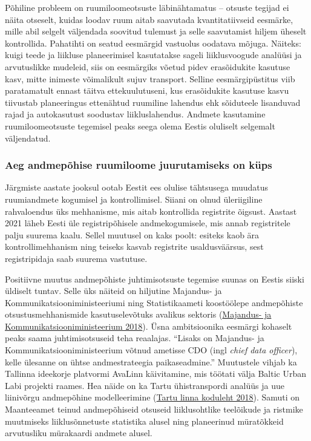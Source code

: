 \documentclass[estonian,]{article}
\begin{document}
Põhiline probleem on ruumiloomeotsuste läbinähtamatus -- otsuste tegijad ei näita otseselt, kuidas loodav ruum aitab saavutada kvantitatiivseid eesmärke, mille abil selgelt väljendada soovitud tulemust ja selle saavutamist hiljem üheselt kontrollida. Pahatihti on seatud eesmärgid vastuolus oodatava mõjuga. Näiteks: kuigi teede ja liikluse planeerimisel kasutatakse sageli liiklusvoogude analüüsi ja arvutuslikke mudeleid, siis on eesmärgiks võetud pidev erasõidukite kasutuse kasv, mitte inimeste võimalikult sujuv transport. Selline eesmärgipüstitus viib paratamatult ennast täitva ettekuulutuseni, kus erasõidukite kasutuse kasvu tiivustab planeeringus ettenähtud ruumiline lahendus ehk sõiduteele lisanduvad rajad ja autokasutust soodustav liikluslahendus. Andmete kasutamine ruumiloomeotsuste tegemisel peaks seega olema Eestis oluliselt selgemalt väljendatud.

\hypertarget{aeg-andmepuxf5hise-ruumiloome-juurutamiseks-on-kuxfcps}{%
\subsubsection*{Aeg andmepõhise ruumiloome juurutamiseks on küps}\label{aeg-andmepuxf5hise-ruumiloome-juurutamiseks-on-kuxfcps}}

Järgmiste aastate jooksul ootab Eestit ees olulise tähtsusega muudatus ruumiandmete kogumisel ja kontrollimisel. Siiani on olnud üleriigiline rahvaloendus üks mehhanisme, mis aitab kontrollida registrite õigsust. Aastast 2021 läheb Eesti üle registripõhisele andmekogumisele, mis annab registritele palju suurema kaalu. Sellel muutusel on kaks poolt: esiteks kaob ära kontrollimehhanism ning teiseks kasvab registrite usaldusväärsus, sest registripidaja saab suurema vastutuse.

Positiivne muutus andmepõhiste juhtimisotsuste tegemise suunas on Eestis siiski üldiselt tuntav. Selle üks näiteid on hiljutine Majandus- ja Kommunikatsiooniministeeriumi ning Statistikaameti koostöölepe andmepõhiste otsustusmehhanismide kasutuselevõtuks avalikus sektoris (\protect\hyperlink{Majandus2018}{Majandus- ja Kommunikatsiooniministeerium 2018}). Üsna ambitsioonika eesmärgi kohaselt peaks saama juhtimisotsuseid teha reaalajas. ``Lisaks on Majandus- ja Kommunikatsiooniministeerium võtnud ametisse CDO (ingl \emph{chief data officer}), kelle ülesanne on ühtse andmestrateegia paikaseadmine.'' Muutustele vihjab ka Tallinna ideekorje platvormi AvaLinn käivitamine, mis töötati välja Baltic Urban Labi projekti raames. Hea näide on ka Tartu ühistranspordi analüüs ja uue liinivõrgu andmepõhine modelleerimine (\protect\hyperlink{Tartu2018}{Tartu linna koduleht 2018}). Samuti on Maanteeamet teinud andmepõhiseid otsuseid liiklusohtlike teelõikude ja ristmike muutmiseks liiklusõnnetuste statistika alusel ning planeerinud müratõkkeid arvutusliku mürakaardi andmete alusel.
\end{document}
